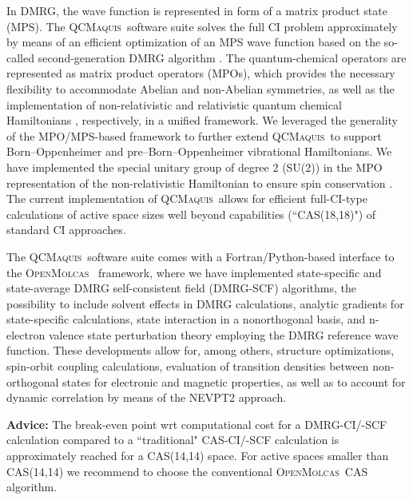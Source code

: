 \documentclass[bibliography=totoc,12pt,a4paper]{scrartcl}
\newcommand{\mol}{\textsc{OpenMolcas}}
\newcommand{\qcm}{\textsc{QCMaquis}}
\begin{document}
In DMRG, the wave function is represented in form of a matrix product state (MPS). 
The \qcm\ software suite solves the full CI problem approximately by means of an efficient optimization of an MPS wave function based on the so-called second-generation DMRG algorithm \cite{Keller_JChemPhys_efficient_2015}.
The quantum-chemical operators are represented as matrix product operators (MPOs), which provides the necessary flexibility to accommodate Abelian and non-Abelian symmetries, as well as the implementation of non-relativistic and relativistic quantum chemical Hamiltonians \cite{maquis-rel}, respectively, in a unified framework.
We leveraged the generality of the MPO/MPS-based framework to further extend \qcm\ to support Born--Oppenheimer\cite{Baiardi2017_vDMRG} and pre--Born--Oppenheimer\cite{Muolo2020_NEAP-DMRG} vibrational Hamiltonians.
We have implemented the special unitary group of degree 2 (SU(2)) in the MPO representation of the non-relativistic Hamiltonian to ensure
spin conservation \cite{Keller_JChemPhys_Spinadapted_2016}.
The current implementation of \qcm\ allows for efficient full-CI-type calculations of active space sizes well beyond capabilities (``CAS(18,18)") of standard CI approaches.

The \qcm\ software suite comes with a Fortran/Python-based interface \cite{interface} to the \mol\ \cite{Aquilante_JComputChem_Molcas_2016} framework, where we have implemented state-specific and state-average DMRG self-consistent field (DMRG-SCF) algorithms, the possibility to include solvent effects in DMRG calculations, analytic gradients for state-specific calculations, state interaction in a nonorthogonal basis,\cite{Knecht_JChemTheoryComput_nonorthogonal_2016} and n-electron valence state perturbation theory employing the DMRG reference wave function.\cite{Freitag_JChemTheoryComput_Multireference_2017}
These developments allow for, among others, structure optimizations, spin-orbit coupling calculations, evaluation of transition densities between non-orthogonal states for electronic and magnetic properties, as well as to account for dynamic correlation by means of the NEVPT2 approach.

\begin{framed}
  \large{\textbf{Advice:} The break-even point wrt computational cost for a DMRG-CI/-SCF calculation compared to a ``traditional" CAS-CI/-SCF calculation is approximately reached for a CAS(14,14) space. For active spaces smaller than CAS(14,14) we recommend to choose the conventional \mol\ CAS algorithm.}
\end{framed}
\end{document}
